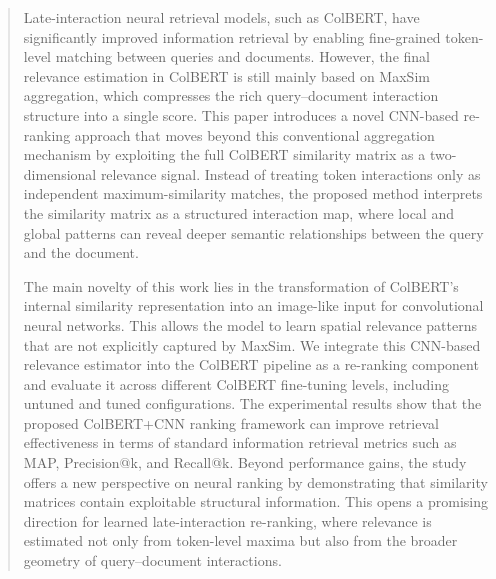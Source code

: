 \documentclass[preprint,5p,times,twocolumn,authoryear]{elsarticle}
\begin{document}
\begin{frontmatter}
\begin{abstract}
Late-interaction neural retrieval models, such as ColBERT, have significantly improved information retrieval by enabling fine-grained token-level matching between queries and documents. However, the final relevance estimation in ColBERT is still mainly based on MaxSim aggregation, which compresses the rich query–document interaction structure into a single score. This paper introduces a novel CNN-based re-ranking approach that moves beyond this conventional aggregation mechanism by exploiting the full ColBERT similarity matrix as a two-dimensional relevance signal. Instead of treating token interactions only as independent maximum-similarity matches, the proposed method interprets the similarity matrix as a structured interaction map, where local and global patterns can reveal deeper semantic relationships between the query and the document.

The main novelty of this work lies in the transformation of ColBERT’s internal similarity representation into an image-like input for convolutional neural networks. This allows the model to learn spatial relevance patterns that are not explicitly captured by MaxSim. We integrate this CNN-based relevance estimator into the ColBERT pipeline as a re-ranking component and evaluate it across different ColBERT fine-tuning levels, including untuned and tuned configurations. The experimental results show that the proposed ColBERT+CNN ranking framework can improve retrieval effectiveness in terms of standard information retrieval metrics such as MAP, Precision@k, and Recall@k. Beyond performance gains, the study offers a new perspective on neural ranking by demonstrating that similarity matrices contain exploitable structural information. This opens a promising direction for learned late-interaction re-ranking, where relevance is estimated not only from token-level maxima but also from the broader geometry of query–document interactions.
\end{abstract}

\begin{graphicalabstract}
\end{graphicalabstract}


\end{frontmatter}
\end{document}
